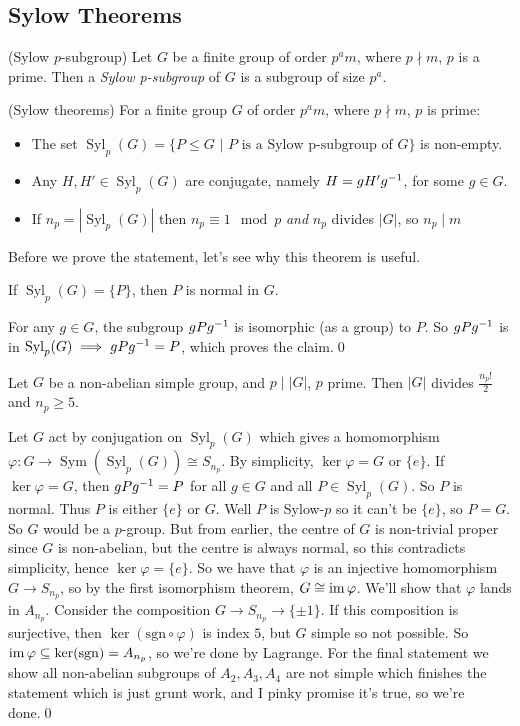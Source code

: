 \documentclass{article}
\DeclareMathOperator{\sym}{Sym}
\DeclareMathOperator{\syl}{Syl}
\begin{document}
\begin{itemize}
\subsection{Sylow Theorems}
\begin{definition}
	(Sylow $ p $-subgroup) Let $ G $ be a finite group of order $ p^am$, where $ p\nmid m $, $ p $ is a prime. Then a \textit{Sylow p-subgroup} of $ G $ is a subgroup of size $ p^a $.
\end{definition}
\begin{theorem}
	(Sylow theorems) For a finite group $ G $ of order $ p^am $, where $ p\nmid m $, $ p $ is prime:
	\begin{itemize}
		\item The set $ \syl_p(G)=\{P\le G$ $ |$ $P \text{ is a Sylow p-subgroup of } G \}$ is non-empty.\\
		\item Any $ H,H'\in \syl_p(G) $ are conjugate, namely $ H=gH'{g}^{-1} $, for some $ g\in G $.\\
		\item If $ n_p=|\syl_p(G)| $ then $ n_p\equiv 1 \mod p $ \textit{and} $ n_p $ divides $ |G| $, so $ n_p\mid m $
	\end{itemize} 
\end{theorem}
Before we prove the statement, let's see why this theorem is useful.
\begin{lemma}
	If $ \syl_p(G)=\{P\} $, then $ P $ is normal in $ G $.
\end{lemma}
\pf For any $ g\in G $, the subgroup $ g P{g}^{-1} $ is isomorphic (as a group) to $ P $. So $ g P{g}^{-1} $ is in $ \syl_p(G) \implies gP\inv g=P$, which proves the claim.\qed
\begin{corollary}
	Let $ G $ be a non-abelian simple group, and $ p\mid |G| $, $ p $ prime. Then $ |G| $ divides $ \frac{n_p!}2 $ and $ n_p\ge 5 $.
\end{corollary}
Let $ G $ act by conjugation on $ \syl_p(G) $ which gives a homomorphism $ \varphi:G\to \sym(\syl_p(G))\cong S_{n_p} $. By simplicity, $ \ker \varphi=G $ or $ \{e\} $. If $ \ker \varphi=G $, then $ gP{g}^{-1}=P $ for all $ g\in G $ and all $ P\in\syl_p(G) $. So $ P $ is normal. Thus $ P $ is either $ \{e\} $ or $ G $. Well $ P$ is Sylow-$ p $ so it can't be $ \{e\} $, so $ P=G $. So $ G $ would be a $ p $-group. But from earlier, the centre of $ G $ is non-trivial proper since $ G $ is non-abelian, but the centre is always normal, so this contradicts simplicity, hence $ \ker \varphi=\{e\} $. So we have that $ \varphi $ is an injective homomorphism $ G\to S_{n_p} $, so by the first isomorphism theorem, $ G\cong \operatorname{im} \varphi $. We'll show that $ \varphi $ lands in $ A_{n_p} $. Consider the composition $ G\to S_{n_p}\to \{\pm 1\} $. If this composition is surjective, then $ \ker (\mathrm{sgn} \circ \varphi) $ is index $ 5 $, but $ G $ simple so not possible. So $ \operatorname{im}\varphi\subseteq \ker(\mathrm{sgn})=A_{n_p} $, so we're done by Lagrange. For the final statement we show all non-abelian subgroups of $ A_2, A_3, A_4 $ are not simple which finishes the statement which is just grunt work, and I pinky promise it's true, so we're done.\qed\\\\

\end{itemize}
\end{document}
